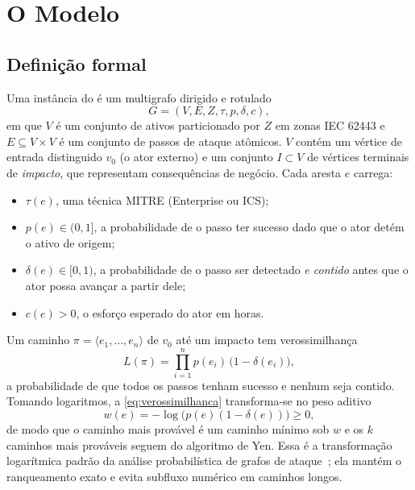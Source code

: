 \section{O Modelo \capm{}}
\label{sec:modelo}

\subsection{Definição formal}

Uma instância do \capm{} é um multigrafo dirigido e rotulado
\begin{equation}
G = (V, E, Z, \tau, p, \delta, c),
\end{equation}
em que $V$ é um conjunto de ativos particionado por $Z$ em zonas IEC 62443 e
$E \subseteq V \times V$ é um conjunto de passos de ataque atômicos. $V$ contém
um vértice de entrada distinguido $v_0$ (o ator externo) e um conjunto
$I \subset V$ de vértices terminais de \emph{impacto}, que representam
consequências de negócio. Cada aresta $e$ carrega:
\begin{itemize}
  \item $\tau(e)$, uma técnica MITRE \attck{} (Enterprise ou ICS);
  \item $p(e) \in (0,1]$, a probabilidade de o passo ter sucesso dado que o ator
    detém o ativo de origem;
  \item $\delta(e) \in [0,1)$, a probabilidade de o passo ser detectado
    \emph{e contido} antes que o ator possa avançar a partir dele;
  \item $c(e) > 0$, o esforço esperado do ator em horas.
\end{itemize}

Um caminho $\pi = \langle e_1,\dots,e_n \rangle$ de $v_0$ até um impacto tem
verossimilhança
\begin{equation}
L(\pi) = \prod_{i=1}^{n} p(e_i)\,\bigl(1 - \delta(e_i)\bigr),
\label{eq:verossimilhanca}
\end{equation}
a probabilidade de que todos os passos tenham sucesso e nenhum seja contido.
Tomando logaritmos, a \cref{eq:verossimilhanca} transforma-se no peso aditivo
\begin{equation}
w(e) = -\log\bigl(p(e)(1-\delta(e))\bigr) \geq 0,
\end{equation}
de modo que o caminho mais provável é um caminho mínimo sob $w$ e os $k$
caminhos mais prováveis seguem do algoritmo de Yen. Essa é a transformação
logarítmica padrão da análise probabilística de grafos de
ataque~\cite{wang2008attack}; ela mantém o ranqueamento exato e evita
subfluxo numérico em caminhos longos.

